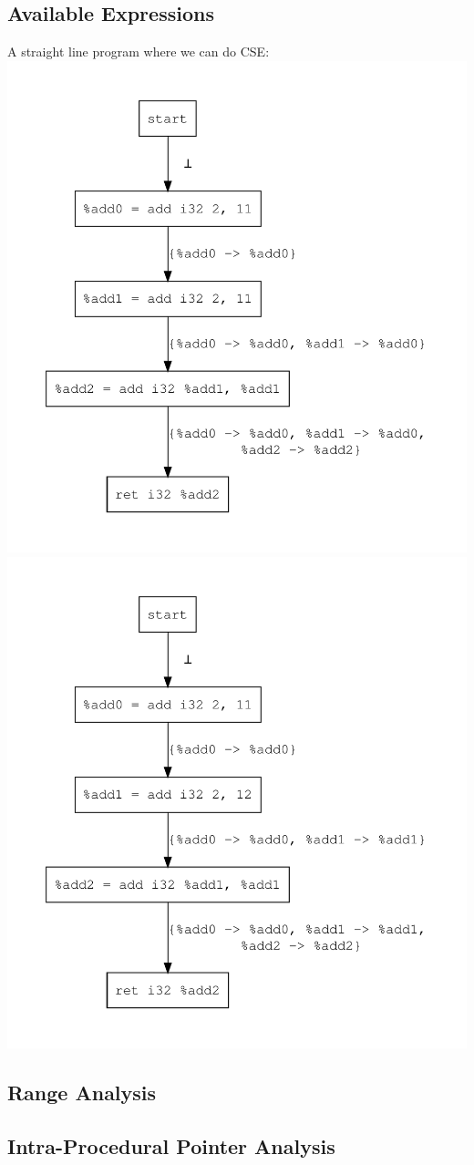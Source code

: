 \documentclass{article}
\theoremstyle{definition}
\begin{document}
\subsection{Available Expressions}
A straight line program where we can do CSE:
\includegraphics[scale=.4]{figures/cse/straight-line/can-do.pdf}
\includegraphics[scale=.4]{figures/cse/straight-line/no-do.pdf}
\subsection{Range Analysis}
\subsection{Intra-Procedural Pointer Analysis}
\end{document}
